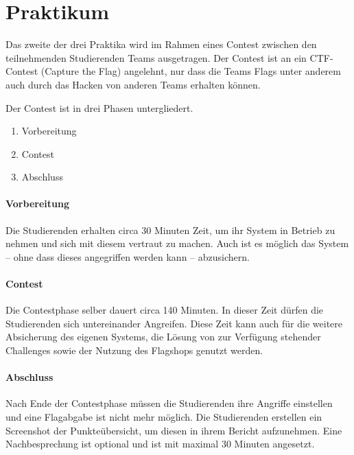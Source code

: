 \section{Praktikum }
\label{sec:Praktikum}

Das zweite der drei Praktika  wird im Rahmen eines Contest zwischen den teilnehmenden Studierenden Teams ausgetragen. Der Contest ist an ein CTF-Contest (Capture the Flag) angelehnt, nur dass die Teams Flags unter anderem auch durch das Hacken von anderen Teams erhalten können.

Der Contest ist in drei Phasen untergliedert.
\begin{enumerate}
	\item Vorbereitung
	\item Contest
	\item Abschluss
\end{enumerate}

\paragraph{Vorbereitung}\label{para:Vorbereitung}
Die Studierenden erhalten circa 30 Minuten Zeit, um ihr System in Betrieb zu nehmen und sich mit diesem vertraut zu machen. Auch ist es möglich das System – ohne dass dieses angegriffen werden kann – abzusichern.

\paragraph{Contest}\label{para:Contest}
Die Contestphase selber dauert circa 140 Minuten. In dieser Zeit dürfen die Studierenden sich untereinander Angreifen. Diese Zeit kann auch für die weitere Absicherung des eigenen Systems, die Lösung von zur Verfügung stehender Challenges sowie der Nutzung des Flagshops genutzt werden.

\paragraph{Abschluss}\label{para:Abschluss}
Nach Ende der Contestphase müssen die Studierenden ihre Angriffe einstellen und eine Flagabgabe ist nicht mehr möglich. Die Studierenden erstellen ein Screenshot der Punkteübersicht, um diesen in ihrem Bericht aufzunehmen. Eine Nachbesprechung ist optional und ist mit maximal 30 Minuten angesetzt.

